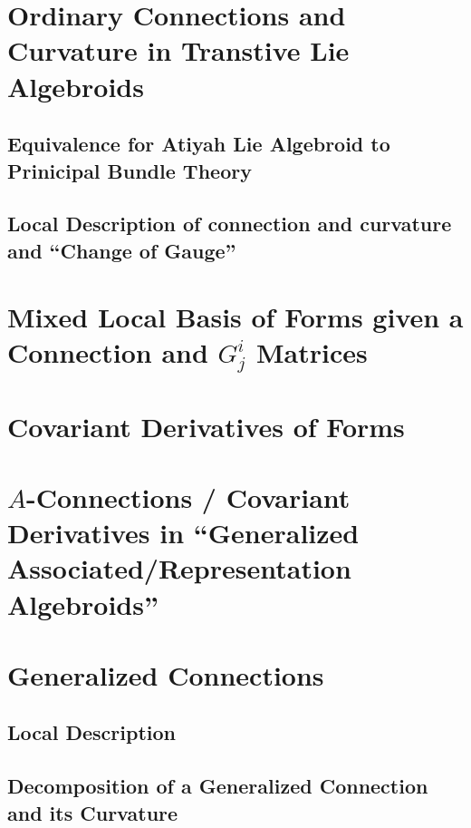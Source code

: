 \documentclass[12pt]{report}
\theoremstyle{definition}
\begin{document}
\section{Ordinary Connections and Curvature in Transtive Lie Algebroids}
\subsection{Equivalence for Atiyah Lie Algebroid to Prinicipal Bundle Theory}
\subsection{Local Description of connection and curvature and ``Change of Gauge''}

\section{Mixed Local Basis of Forms given a Connection and $G^i_j$ Matrices}

\section{Covariant Derivatives of Forms}

\section{$A$-Connections / Covariant Derivatives in ``Generalized Associated/Representation Algebroids''}


\section{Generalized Connections}
\subsection{Local Description}
\subsection{Decomposition of a Generalized Connection and its Curvature}
\end{document}
